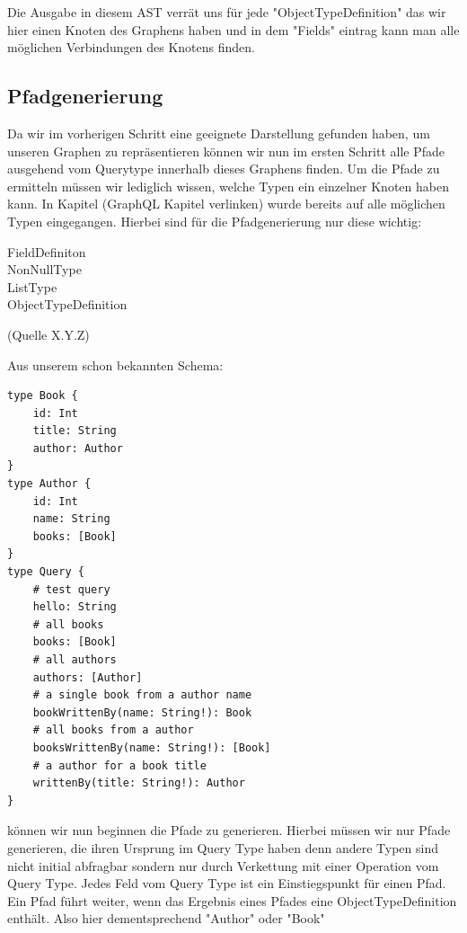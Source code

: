 Die Ausgabe in diesem AST verrät uns für jede "ObjectTypeDefinition" das wir hier einen Knoten des Graphens haben
und in dem "Fields" eintrag kann man alle möglichen Verbindungen des Knotens finden.

\subsection{Pfadgenerierung}

Da wir im vorherigen Schritt eine geeignete Darstellung gefunden haben, um unseren Graphen zu repräsentieren können wir
nun im ersten Schritt alle Pfade ausgehend vom Querytype innerhalb dieses Graphens finden.
Um die Pfade zu ermitteln müssen wir lediglich wissen, welche Typen ein einzelner Knoten haben kann.
In Kapitel (GraphQL Kapitel verlinken) wurde bereits auf alle möglichen Typen eingegangen.
Hierbei sind für die Pfadgenerierung nur diese wichtig:
\begin{center}
  \begin{description}
    \item[FieldDefiniton]
    \item[NonNullType]
    \item[ListType]
    \item[ObjectTypeDefinition]
  \end{description} (Quelle X.Y.Z)
\end{center}

Aus unserem schon bekannten Schema:

\begin{verbatim}
type Book {
    id: Int
    title: String
    author: Author
}
type Author {
    id: Int
    name: String
    books: [Book]
}
type Query {
    # test query
    hello: String
    # all books
    books: [Book]
    # all authors
    authors: [Author]
    # a single book from a author name
    bookWrittenBy(name: String!): Book
    # all books from a author
    booksWrittenBy(name: String!): [Book]
    # a author for a book title
    writtenBy(title: String!): Author
}
\end{verbatim}

können wir nun beginnen die Pfade zu generieren. Hierbei müssen wir nur Pfade generieren, die ihren
Ursprung im Query Type haben denn andere Typen sind nicht initial abfragbar sondern nur durch Verkettung mit einer
Operation vom Query Type. Jedes Feld vom Query Type ist ein Einstiegspunkt für einen Pfad.
Ein Pfad führt weiter, wenn das Ergebnis eines Pfades eine ObjectTypeDefinition enthält. Also hier dementsprechend
"Author" oder "Book"

